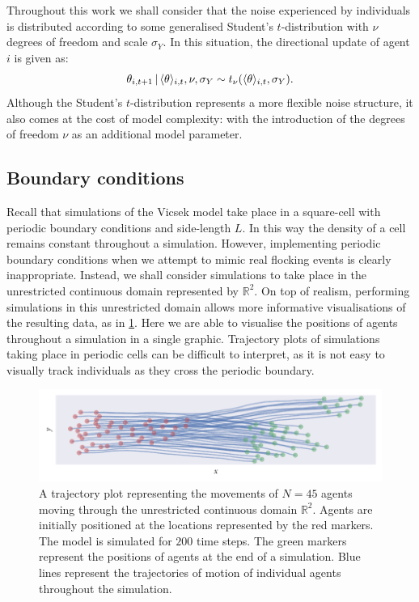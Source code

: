 Throughout this work we shall consider that the noise experienced by
individuals is distributed according to some generalised Student's
$t$-distribution with $\nu$ degrees of freedom and scale $\sigma_Y$. In this
situation, the directional update of agent $i$ is given as:
\begin{equation}
  \label{eq:students_update}
  \theta_{i,t+1} \,|\, \langle\theta\rangle_{i,t}, \nu, \sigma_Y \sim
     t_{\nu}(\langle\theta\rangle_{i,t}, \sigma_Y).
\end{equation}
Although the Student's $t$-distribution represents a more flexible noise
structure, it also comes at the cost of model complexity: with the introduction
of the degrees of freedom $\nu$ as an additional model parameter.

\subsection{Boundary conditions}

Recall that simulations of the Vicsek model take place in a square-cell with
periodic boundary conditions and side-length $L$. In this way the density of a
cell remains constant throughout a simulation. However, implementing periodic
boundary conditions when we attempt to mimic real flocking events is clearly
inappropriate. Instead, we shall consider simulations to take place in the
unrestricted continuous domain represented by $\mathbb{R}^2$. On top of
realism, performing simulations in this unrestricted domain allows more
informative visualisations of the resulting data, as in
\cref{fig:example_traj}. Here we are able to visualise the positions of agents
throughout a simulation in a single graphic. Trajectory plots of simulations
taking place in periodic cells can be difficult to interpret, as it is not easy
to visually track individuals as they cross the periodic boundary.

\begin{figure}[tb]
  \includegraphics{example_traj_plot.pdf}
  \caption{A trajectory plot representing the movements of $N=45$ agents
    moving through the unrestricted continuous domain $\mathbb{R}^2$.
    Agents are initially positioned at the locations represented by the red
    markers. The model is simulated for $200$ time steps. The green markers
    represent the positions of agents at the end of a simulation. Blue lines
    represent the trajectories of motion of individual agents throughout the
    simulation.}
    \label{fig:example_traj}
\end{figure}

